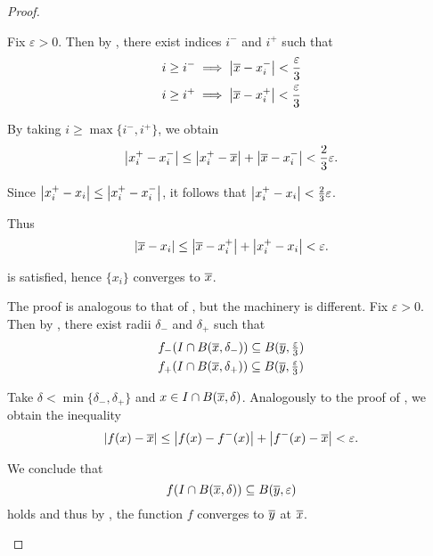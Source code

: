 \begin{proof}\mbox{}
  \begin{description}
     Fix \( \varepsilon > 0 \). Then by , there exist indices \( i^- \) and \( i^+ \) such that
    \begin{align*}
      &i \geq i^- \implies \left\vert \overline{x} - x_i^- \right\vert < \frac \varepsilon 3 \\
      &i \geq i^+ \implies \left\vert \overline{x} - x_i^+ \right\vert < \frac \varepsilon 3
    \end{align*}

    By taking \( i \geq \max \{ i^-, i^+ \} \), we obtain
    \begin{equation*}
      \left\vert x_i^+ - x_i^- \right\vert \leq \left\vert x_i^+ - \overline{x} \right\vert + \left\vert \overline{x} - x_i^- \right\vert < \frac 2 3 \varepsilon.
    \end{equation*}

    Since \( \left\vert x_i^+ - x_i \right\vert \leq \left\vert x_i^+ - x_i^- \right\vert \), it follows that \( \left\vert x_i^+ - x_i \right\vert < \frac 2 3 \varepsilon \).

    Thus
    \begin{equation*}
      \left\vert \overline{x} - x_i \right\vert \leq \left\vert \overline{x} - x_i^+ \right\vert + \left\vert x_i^+ - x_i \right\vert < \varepsilon.
    \end{equation*}

     is satisfied, hence \( \{ x_i \} \) converges to \( \overline{x} \).

     The proof is analogous to that of , but the machinery is different. Fix \( \varepsilon > 0 \). Then by , there exist radii \( \delta_- \) and \( \delta_+ \) such that
    \begin{align*}
      &f_-(I \cap B(\overline{x}, \delta_-)) \subseteq B(\overline{y}, \tfrac \varepsilon 3) \\
      &f_+(I \cap B(\overline{x}, \delta_+)) \subseteq B(\overline{y}, \tfrac \varepsilon 3)
    \end{align*}

    Take \( \delta < \min \{ \delta_-, \delta_+ \} \) and \( x \in I \cap B(\overline{x}, \delta) \). Analogously to the proof of , we obtain the inequality
    \begin{equation*}
      \left\vert f(x) - \overline{x} \right\vert \leq \left\vert f(x) - f^-(x) \right\vert + \left\vert f^-(x) - \overline{x} \right\vert < \varepsilon.
    \end{equation*}

    We conclude that
    \begin{equation*}
      f(I \cap B(\overline{x}, \delta)) \subseteq B(\overline{y}, \varepsilon)
    \end{equation*}
    holds and thus by , the function \( f \) converges to \( \overline{y} \) at \( \overline{x} \).
  \end{description}
\end{proof}

